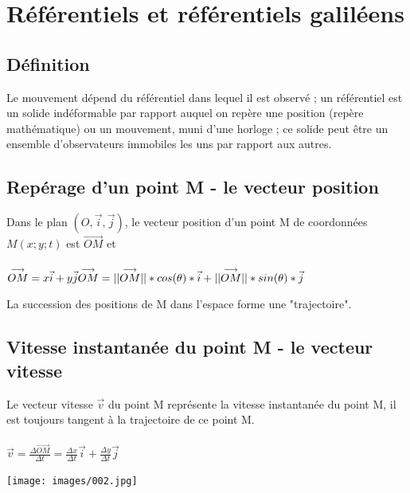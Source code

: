 \documentclass[a4paper,10pt]{book}
\begin{document}
\section{Référentiels et référentiels galiléens}
\subsection{Définition}
Le mouvement dépend du référentiel dans lequel il est observé ; un référentiel est un solide indéformable par rapport auquel on repère une position (repère mathématique) ou un mouvement, muni d'une horloge ; ce solide peut être un ensemble d'observateurs immobiles les uns par rapport aux autres.

\subsection{Repérage d'un point M - le vecteur position}

Dans le plan $(O, \vec{i}, \vec{j})$, le vecteur position d'un point M de coordonnées $M(x;y;t)$ est $\overset{\longrightarrow}{OM}$ et \\\\
$\overset{\longrightarrow}{OM} =x\vec{i}+y\vec{j}\\
\overset{\longrightarrow}{OM}=||\overset{\longrightarrow}{OM}||*cos(\theta)*\vec{i}+||\overset{\longrightarrow}{OM}||*sin(\theta)*\vec{j}$\\
\begin{center}  \end{center}
La succession des positions de M dans l’espace forme une "trajectoire".\\

\subsection{Vitesse instantanée du point M - le vecteur vitesse}
Le vecteur vitesse $\vec{v}$ du point M représente la vitesse instantanée du point M, il est toujours tangent à la trajectoire de ce point M.\\\\
$\vec{v}=\frac{\Delta\overset{\longrightarrow}{OM}}{\Delta t}=\frac{\Delta x}{\Delta t}\vec{i}+\frac{\Delta y}{\Delta t}\vec{j}$\\
\begin{center}
\texttt{[image: images/002.jpg]}
\end{center}
\end{document}
